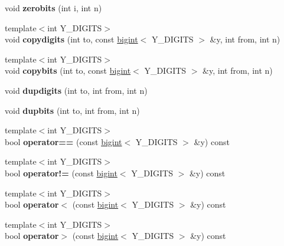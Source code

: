 \begin{DoxyCompactItemize}
void {\bfseries zerobits} (int i, int n)
\item 
\mbox{\label{structbigint_a4694155d250bbc896ddce4d294681c8f}} 
{\footnotesize template$<$int Y\+\_\+\+D\+I\+G\+I\+TS$>$ }\\void {\bfseries copydigits} (int to, const \hyperlink{structbigint}{bigint}$<$ Y\+\_\+\+D\+I\+G\+I\+TS $>$ \&y, int from, int n)
\item 
\mbox{\label{structbigint_a262bca28b013b25af643bb691af40a3a}} 
{\footnotesize template$<$int Y\+\_\+\+D\+I\+G\+I\+TS$>$ }\\void {\bfseries copybits} (int to, const \hyperlink{structbigint}{bigint}$<$ Y\+\_\+\+D\+I\+G\+I\+TS $>$ \&y, int from, int n)
\item 
\mbox{\label{structbigint_a5d12ed3c4a08d3ccbb318d9c5fb906ce}} 
void {\bfseries dupdigits} (int to, int from, int n)
\item 
\mbox{\label{structbigint_aa74fdf7e468f16bf49383ef8083e5e62}} 
void {\bfseries dupbits} (int to, int from, int n)
\item 
\mbox{\label{structbigint_a52ae643a11c12fde1df268428ecae7cd}} 
{\footnotesize template$<$int Y\+\_\+\+D\+I\+G\+I\+TS$>$ }\\bool {\bfseries operator==} (const \hyperlink{structbigint}{bigint}$<$ Y\+\_\+\+D\+I\+G\+I\+TS $>$ \&y) const
\item 
\mbox{\label{structbigint_aa1a4b8f666b091218a239487babfb05e}} 
{\footnotesize template$<$int Y\+\_\+\+D\+I\+G\+I\+TS$>$ }\\bool {\bfseries operator!=} (const \hyperlink{structbigint}{bigint}$<$ Y\+\_\+\+D\+I\+G\+I\+TS $>$ \&y) const
\item 
\mbox{\label{structbigint_adde64ef4f3e9c35e7d520a731108aba4}} 
{\footnotesize template$<$int Y\+\_\+\+D\+I\+G\+I\+TS$>$ }\\bool {\bfseries operator$<$} (const \hyperlink{structbigint}{bigint}$<$ Y\+\_\+\+D\+I\+G\+I\+TS $>$ \&y) const
\item 
\mbox{\label{structbigint_ac9a645a1bca2713954e5fc12a9712f30}} 
{\footnotesize template$<$int Y\+\_\+\+D\+I\+G\+I\+TS$>$ }\\bool {\bfseries operator$>$} (const \hyperlink{structbigint}{bigint}$<$ Y\+\_\+\+D\+I\+G\+I\+TS $>$ \&y) const

\end{DoxyCompactItemize}
